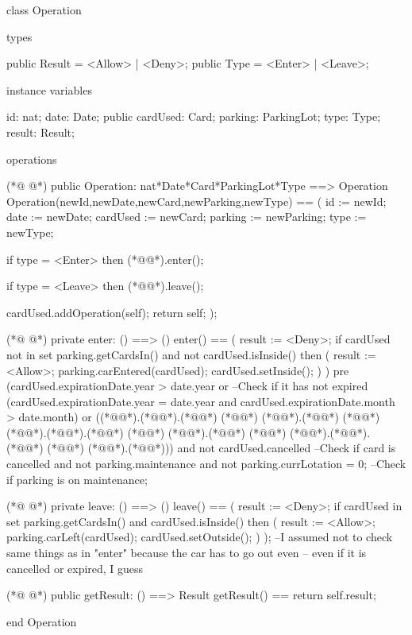 \begin{vdmpp}[breaklines=true]
class Operation

types

public Result = <Allow> | <Deny>;
public Type = <Enter> | <Leave>;

instance variables

id: nat;
date: Date;
public cardUsed: Card;
parking: ParkingLot;
type: Type;
result: Result;

operations

(*@
\label{Operation:19}
@*)
public Operation: nat*Date*Card*ParkingLot*Type ==> Operation
 Operation(newId,newDate,newCard,newParking,newType) == (
  id := newId;
  date := newDate;
  cardUsed := newCard;
  parking := newParking;
  type := newType;
  
  if type = <Enter>
  then (*@@*).enter();
  
  if type = <Leave>
  then (*@@*).leave();
  
  cardUsed.addOperation(self);
  return self;
 );
 
(*@
\label{enter:37}
@*)
private enter: () ==> ()
 enter() == (
  result := <Deny>;
  if cardUsed not in set parking.getCardsIn() and not cardUsed.isInside()
  then (
  result := <Allow>;
  parking.carEntered(cardUsed);
  cardUsed.setInside();
  )
 ) 
 pre (cardUsed.expirationDate.year > date.year or --Check if it has not expired
  (cardUsed.expirationDate.year = date.year and cardUsed.expirationDate.month > date.month) or
  ((*@@*).(*@@*).(*@@*) (*@\vdmnotcovered{=}@*) (*@@*).(*@@*) (*@@*) (*@@*).(*@@*).(*@@*) (*@\vdmnotcovered{=}@*) (*@@*).(*@@*)
   (*@@*) (*@@*).(*@@*).(*@@*) (*@\vdmnotcovered{>=}@*) (*@@*).(*@@*)))
   and not cardUsed.cancelled --Check if card is cancelled
   and not parking.maintenance
   and not parking.currLotation = 0; --Check if parking is on maintenance;

(*@
\label{leave:55}
@*)
private leave: () ==> ()
 leave() == (
  result := <Deny>;
  if cardUsed in set parking.getCardsIn() and cardUsed.isInside()
  then (
  result := <Allow>;
  parking.carLeft(cardUsed);
  cardUsed.setOutside();
  )
 ); --I assumed not to check same things as in "enter" because the car has to go out even
   -- even if it is cancelled or expired, I guess
   
(*@
\label{getResult:67}
@*)
public getResult: () ==> Result
 getResult() == return self.result;

end Operation
\end{vdmpp}
